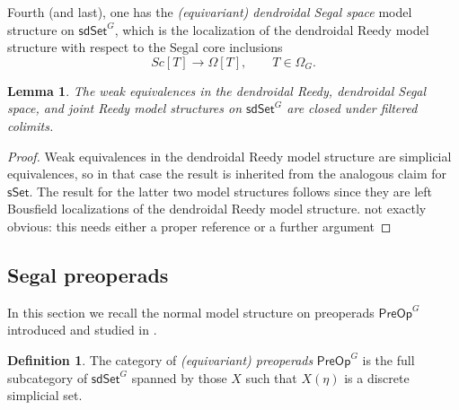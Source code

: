 \documentclass[a4paper,10pt
,draft
]{article}%
\numberwithin{equation}{section}
\numberwithin{figure}{section}
\newtheorem{lemma}[equation]{Lemma}%
\theoremstyle{definition} %
\newtheorem{definition}[equation]{Definition}%
\newcommand{\longto}{\longrightarrow}%
\newcommand{\1}{\ensuremath{\mathbbm 1}}%
\begin{document}
Fourth (and last), one has the \textit{(equivariant) dendroidal Segal space} model structure on $\mathsf{sdSet}^G$,
which is the localization of the dendroidal Reedy model structure with respect to the Segal core inclusions
\[
	Sc[T] \longto \Omega[T],
\qquad
	T \in \Omega_G.
\]



\begin{lemma}\label{FCOLIM_WE_LEM}
	The weak equivalences in the dendroidal Reedy, dendroidal Segal space, and joint Reedy model structures 
	on $\mathsf{sdSet}^G$ are closed under filtered colimits.
\end{lemma}

\begin{proof}
	Weak equivalences in the dendroidal Reedy model structure are simplicial equivalences, 
	so in that case the result is inherited from the analogous claim for $\mathsf{sSet}$.
%	
	The result for the latter two model structures follows
	since they are left Bousfield localizations of the dendroidal Reedy model structure.
	{\color{red} not exactly obvious: this needs either a proper reference or a further argument}
\end{proof}






\subsection{Segal preoperads}
\label{SPREOP_SEC}


In this section we recall the normal model structure on preoperads
$\mathsf{PreOp}^G$
introduced and studied in \cite[\S 4 and \S 5]{BP_edss}.

\begin{definition}
	The category of \textit{(equivariant) preoperads} $\mathsf{PreOp}^G$ is the full subcategory of $\mathsf{sdSet}^G$ spanned by those $X$ such that
	$X(\eta)$ is a discrete simplicial set.
\end{definition}
\end{document}
